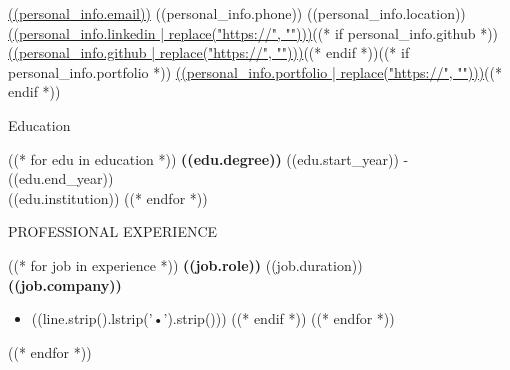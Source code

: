 \documentclass[9pt]{resume}
\begin{document}
\small

\vspace{-1.6em}

\begin{center}
  \href{mailto:((personal_info.email))}{((personal_info.email))} \quad
  ((personal_info.phone)) \quad
  ((personal_info.location)) \\[0.5em]
  \href{((personal_info.linkedin))}{((personal_info.linkedin | replace("https://", "")))}((* if personal_info.github *)) \quad
  \href{((personal_info.github))}{((personal_info.github | replace("https://", "")))}((* endif *))((* if personal_info.portfolio *)) \quad
  \href{((personal_info.portfolio))}{((personal_info.portfolio | replace("https://", "")))}((* endif *))
\end{center}

\vspace{-0.25em}
\begin{rSection}{Education}
\vspace{-0.35em}

((* for edu in education *))
\textbf{((edu.degree))} \hfill ((edu.start_year)) - ((edu.end_year)) \\
((edu.institution))
((* endfor *))

\end{rSection}

\vspace{-0.90em}
\begin{rSection}{PROFESSIONAL EXPERIENCE}
\vspace{-0.45em}

((* for job in experience *))
\textbf{((job.role))} \hfill ((job.duration))\\
\textbf{((job.company))}
\begin{itemize}
\itemsep -1.5pt {}
((* for line in job.description.split('\n') *))
((* if line.strip() *))
    \item ((line.strip().lstrip('•').strip()))
((* endif *))
((* endfor *))
\end{itemize}

((* endfor *))
\end{rSection}
\end{document}

